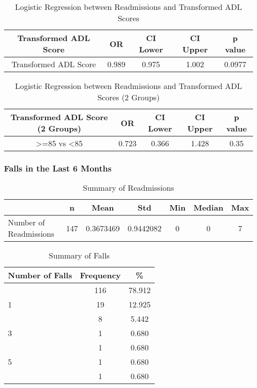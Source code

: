 \documentclass[12pt,]{article}
\begin{document}
\begin{table}[!h]

\caption{\label{tab:unnamed-chunk-18}Logistic Regression between Readmissions and Transformed ADL Scores}
\centering
\begin{tabular}{ccccc}
\toprule
Transformed ADL Score & OR & CI Lower & CI Upper & p value\\
\midrule
\rowcolor{white}  Transformed ADL Score & 0.989 & 0.975 & 1.002 & 0.0977\\
\bottomrule
\end{tabular}
\end{table}

\begin{table}[!h]

\caption{\label{tab:unnamed-chunk-18}Logistic Regression between Readmissions and Transformed ADL Scores (2 Groups)}
\centering
\begin{tabular}{ccccc}
\toprule
Transformed ADL Score (2 Groups) & OR & CI Lower & CI Upper & p value\\
\midrule
\rowcolor{white}  >=85 vs <85 & 0.723 & 0.366 & 1.428 & 0.35\\
\bottomrule
\end{tabular}
\end{table}

\pagebreak

\subsubsection{Falls in the Last 6
Months}\label{falls-in-the-last-6-months}

\begin{table}[!h]

\caption{\label{tab:unnamed-chunk-19}Summary of Readmissions}
\centering
\begin{tabular}{>{\raggedright\arraybackslash}p{5cm}cccccc}
\toprule
  & n & Mean & Std & Min & Median & Max\\
\midrule
\rowcolor{white}  Number of Readmissions & 147 & 0.3673469 & 0.9442082 & 0 & 0 & 7\\
\bottomrule
\end{tabular}
\end{table}

\begin{table}[!h]

\caption{\label{tab:unnamed-chunk-19}Summary of Falls}
\centering
\begin{tabular}{>{\centering\arraybackslash}p{5cm}cc}
\toprule
Number of Falls & Frequency & \%\\
\midrule
0 & 116 & 78.912\\
\rowcolor[HTML]{E3E5E7}  1 & 19 & 12.925\\
2 & 8 & 5.442\\
\rowcolor[HTML]{E3E5E7}  3 & 1 & 0.680\\
4 & 1 & 0.680\\
\addlinespace
\rowcolor[HTML]{E3E5E7}  5 & 1 & 0.680\\
7 & 1 & 0.680\\
\bottomrule
\end{tabular}
\end{table}
\end{document}
